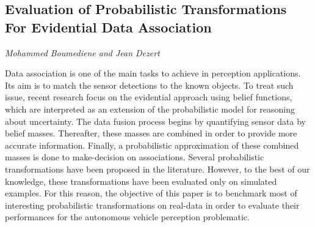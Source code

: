 \documentclass[../booklet.tex]{subfiles}
\begin{document}
\subsection[Evaluation of Probabilistic Transformations For Evidential Data Association. {\it Mohammed Boumediene and Jean Dezert}]{Evaluation of Probabilistic Transformations For Evidential Data Association}
 

\begin{center}
  {\it Mohammed Boumediene and Jean Dezert}
\end{center}

\vskip 0.8cm


Data association is one of the main tasks to achieve in perception applications. Its aim is to match the sensor detections to the known objects. To treat such issue, recent research focus on the evidential approach using belief functions, which are interpreted as an extension of the probabilistic model for reasoning about uncertainty. The data fusion process begins by quantifying sensor data by belief masses. Thereafter, these masses are combined in order to provide more accurate information. Finally, a probabilistic approximation of these combined masses is done to make-decision on associations. Several probabilistic transformations have been proposed in the literature. However, to the best of our knowledge, these transformations have been evaluated only on simulated examples. For this reason, the objective of this paper is to benchmark most of interesting probabilistic transformations on real-data in order to evaluate their performances for the autonomous vehicle perception problematic. 
\end{document}
